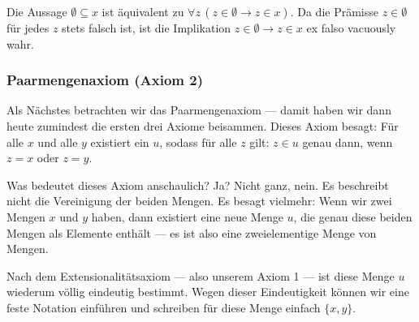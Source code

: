 \begin{math-stroke}



\begin{short-proof}
Die Aussage $\emptyset \subseteq x$ ist äquivalent zu $\forall z \, (z \in \emptyset \rightarrow z \in x)$. Da die Prämisse $z \in \emptyset$ für jedes $z$ stets falsch ist, ist die Implikation $z \in \emptyset \rightarrow z \in x$ ex falso vacuously wahr.
\end{short-proof}
\end{math-stroke}

\begin{ai-global-state-checkpoint-invisible-content}
\end{ai-global-state-checkpoint-invisible-content}

\subsubsection{Paarmengenaxiom (Axiom 2)}
\begin{spoken-clean}[01:26:22 - 01:29:00]
Als Nächstes betrachten wir das Paarmengenaxiom --- damit haben wir dann heute zumindest die ersten drei Axiome beisammen. Dieses Axiom besagt: Für alle $x$ und alle $y$ existiert ein $u$, sodass für alle $z$ gilt: $z \in u$ genau dann, wenn $z = x$ oder $z = y$.

Was bedeutet dieses Axiom anschaulich? Ja?
Nicht ganz, nein. Es beschreibt nicht die Vereinigung der beiden Mengen. Es besagt vielmehr: Wenn wir zwei Mengen $x$ und $y$ haben, dann existiert eine neue Menge $u$, die genau diese beiden Mengen als Elemente enthält --- es ist also eine zweielementige Menge von Mengen.

Nach dem Extensionalitätsaxiom --- also unserem Axiom 1 --- ist diese Menge $u$ wiederum völlig eindeutig bestimmt. Wegen dieser Eindeutigkeit können wir eine feste Notation einführen und schreiben für diese Menge einfach $\{x, y\}$.
\end{spoken-clean}

